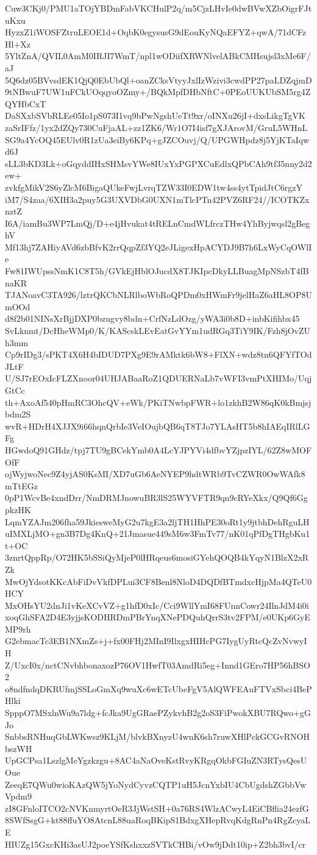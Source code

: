 Cuw3CKj0/PMU1aTOjYBDmFabVKCHulP2q/m5CjzLHvIe0dwBVwXZbOigrFJtuKxu
HyzxZ1iWOSFZtruLEOE1d+OqbK0egysusG9dEouKyNQaEFYZ+qwA/71dCFzHl+Xz
5YltZnA/QVIL0AmM0IRJI7WmT/npl1wODiifXRWNlvelABkCMHsujsl3xMe6F/aJ
5Q6dz05BVvsdEK1QjQ0EbUbQl+oanZCksVtyyJxlIzWzivi3cwdPP27paLDZqjmD
9tNBwuF7UW1uFCkUOqqyoOZmy+/BQkMpfDHbNftC+0PEoUUKUbSM5rg4ZQYHbCxT
DaSXxbSVbRLEe05Io1pS073I1vq9bPwNgshUeTt9xr/oINXu26jI+dxsLikgTgVK
zaSrIFfz/1yx2dZQy730CuFjaAL+zz1ZK6/Wr1O7I4isf7gXJArovM/GruL5WHnL
SG9a4YcOQ45EUlv0R1zUa3eiBy6KPq+gJZCOuvj/Q/UPGWHpdz8j5YjKTaIqwd6J
sLL3bKD3Lk+oGqyddIHxSHMsvYWe8IUxYxPGPXCuEdlxQPbCAh9tf35nny2d2ew+
zvkfgMikV2S6yZlcM6BigaQUkeFwjLvrqTZW33I0EDW1tw4ss4ytTpidJtC6rgzY
iM7/S4zaa/6XIH3a2puy5G3UXVDbG0UXN1mTlcPTn42PVZ6RF24//ICOTKZxnztZ
I6A/iamBu3WP7LmQj/D+e4jHvukat4tRELnCmdWLfrczTHw4YhByjwqsl2gBeghV
Mf13hj7ZAHiyAVd6zbBfvK2rrQqpZf3YQ2eJLigexHpACYDJ9B7h6LxWyCqOWlIe
Fw81IWUpssNmK1C8T5h/GVkEjHblOJucdX8TJKIpcDkyLLBuagMpNSzbT4fBnaKR
TJANoavC3TA926/lztrQKCbNLRlboWbRoQPDm0xHWmFr9jelHaZ6aHL8OP8UmOOd
d8f2b01NINsXrBjjDXP0bzugvy8bdn+CrfNzLdOzg/yWA3i0b8D+inbKifihbx45
SvLknmt/DcHheWMp0/K/KAScskLEvEatGvYYm1udRGq3TiY9IK/Fzh8jOvZUh3mm
Cp9rIDg3/sPKT4X6H4bIDUD7PXg9E9rAMktk6bW8+FlXN+wdz8tn6QFYfTOdJLtF
U/SJ7rEOxIcFLZXnoor04UHJABaaRoZ1QDUERNaLb7vWFI3vmPtXHIMo/UqjGtCc
th+AxoAf540pHmRC3OhcQV+eWk/PKiTNwbpFWR+lo1zkhB2W86qK0kBmjsjbdm2S
wvR+HDrH4XJJX9i66hqnQrbIe3VeIOujbQB6qT8TJo7YLAsHT5b8hIAEqIRlLGFg
HGwdoQ91GHdz/tpj7TU9gBCekYmb0A4LcYJPYVi4dfbvYZjpzIYL/62Z8wMOFOfF
ojWyjwoNec9Z4yjAS0KsMI/XD7uGb6AeNYEP9hdtWRb9TvCZWR0OwWAfk8mTtEGz
0pP1WcvBe4xndDrr/NmDRMJnowuBR3lS25WYVFTR9qn9cRYeXkx/Q9Qf6GgpkzHK
LqmYZAJm206fha59JkiesweMyG2u7kgE3a2ljTH1HhPE30oRt1y9jtbhDehRguLH
uIMXLjMO+gn3B7Dg4KnQ+21Jmasue449sM6w3FmTv77/nK01qPfDgTHgbKu1t+OC
3znrtQppRp/O72HK5bSSiQyMjeP0lHRqeus6mosiGYehQOQB4kYqyN1BlzX2xRZk
MwOjYdsotKKcAbFiDvVkfDPLui3CF8Benl8NloD4DQDfBTmdxcHjpMa4QTeU0HCY
MxOHsYU2dnJi1vKeXCvVZ+g1hfD0xIc/Cci9WllYmI68FUnnCowr24IlnJdM4i0i
xoqGhSFA2D4E3yjjsKODHRDmPBrYnqXNePDQuhQrrS3tv2FPM/e0UKp6GyEMP9rh
G2ebmacTc3EB1NXmZs+j+fx00FHj2MInI9IlxgxHIHcPG7IygUyRtcQcZvNvwyIH
Z/UxcI0x/nctCNvbhbonaxozP76OV1HwfT03AmdRi5eg+Innd1GEro7HP56hBSO2
o8ndfndqDKRUfmjSSLoGmXq9wuXc6wETcUbeFgV5AlQWFEAuFTVxSbci4BePHlki
SpppO7MSxlnWu9a7ldg+fcJka9UgGRaePZykvhB2g2oS3FiPwokXBU7RQwo+gGJo
SnbbsRNHuqGbLWKwsz9KLjM/blvkBXnyzU4wnK6sh7ruwXHlPckGCGvRNOHbszWH
UpGCPsa1LszlgMeYgzkzgu+8AC4aNaOveKstRvyKRgqOkbFGIuZN3RTysQesUOue
ZeeqE7QWu0wioKAzQW5jYoNydCyvzCQTP1uH5JcnYxbIU4CbUgdshZGbbVwVpdm9
zI8GFnloITCO2cNVKnmyrtOeR3JjWstSH+0a76RS4WlzACwyL4EiCBflia24ezfG
8SWfSsgG+kt88ffuYO8AtcnL88uaRoqBKipS1BdxgXHepRvqKdgRnPn4RgZcyaLE
HIUZg15GxcKHi3asUJ2poeYSfKshxxzSVTkCHBi/vOw9jDdt10ip+Z2bh3bvI/cr
